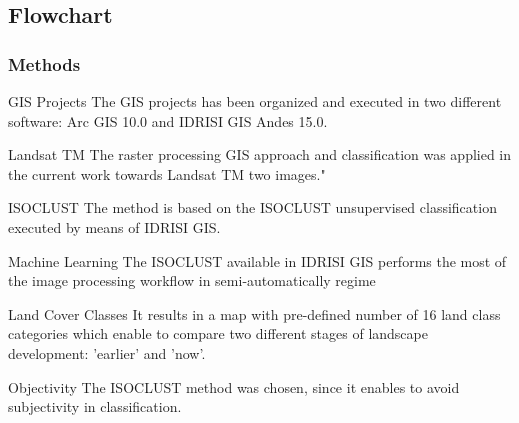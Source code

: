 \documentclass[pdflatex,compress,8pt,
	xcolor={dvipsnames,dvipsnames,svgnames,x11names,table},
	hyperref={	
	breaklinks = true, 
	pdfauthor={Lemenkova Polina}, 
	pdfsubject={Preentation}, 
	pdfcreator={Lemenkova Polina}, 
	pdfproducer={Lemenkova Polina}, 
	colorlinks=true,
	linkcolor=Tomato, 
	citecolor=DeepPink3, 
	urlcolor = NavyBlue, 
	breaklinks = true}]{beamer}
\begin{document}
\subsection{Flowchart}
\begin{frame}\frametitle{Methods}
\vspace{3em}
	\begin{block}{GIS Projects}
The GIS projects has been organized and executed in two different software: \alert{Arc GIS 10.0} and \alert{IDRISI GIS Andes 15.0}.
	\end{block}

	\begin{block}{Landsat TM}
The raster processing GIS approach and classification was applied in the current work towards Landsat TM two images."
	\end{block}

	\begin{block}{ISOCLUST}
The method is based on the ISOCLUST unsupervised classification executed by means of IDRISI GIS.
	\end{block}

	\begin{block}{Machine Learning}
The ISOCLUST available in IDRISI GIS performs the most of the image processing workflow in semi-automatically regime
	\end{block}
	
	\begin{block}{Land Cover Classes}
It results in a map with pre-defined number of 16 land class categories which enable to compare two different stages of landscape development: \alert{'earlier'} and \alert{'now'}.
	\end{block}

	\begin{block}{Objectivity}
The ISOCLUST method was chosen, since it enables to avoid subjectivity in classification.
	\end{block}

\end{frame}
\end{document}
